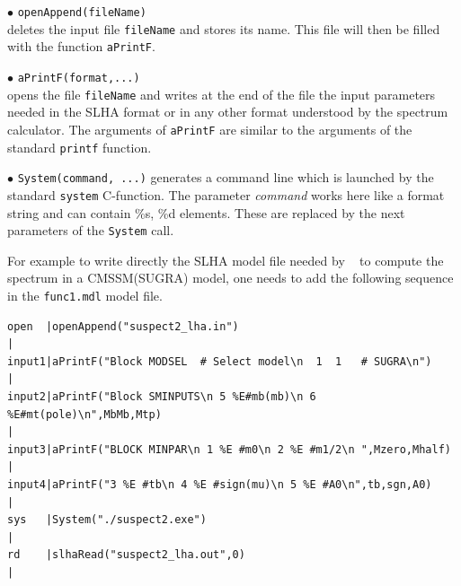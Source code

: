 \documentclass[12pt,a4paper]{article}
\begin{document}
\noindent
$\bullet$ \verb|openAppend(fileName)|\\
deletes the input file \verb|fileName| and stores its name. This file will then be filled with
the function \verb|aPrintF|.

\noindent
$\bullet$ \verb|aPrintF(format,...)|\\
opens the file \verb|fileName| and writes at the end of the file the input parameters needed in the SLHA format or in any other format
understood by the spectrum calculator.  The arguments of 
\verb|aPrintF| are similar to the arguments of the standard \verb|printf| function.

\noindent
$\bullet$ \verb|System(command, ...)|  
generates a command line which is launched by the standard \verb|system|
C-function. The parameter {\it command} works here like a format string and can contain \%s, \%d elements. 
These are replaced by the next parameters  of the \verb|System|  call.

For example to write directly the SLHA model file needed by \suspect~ to compute 
the spectrum in a CMSSM(SUGRA) model, one needs to add the following sequence in the \verb|func1.mdl| model file.

\begin{verbatim}
open  |openAppend("suspect2_lha.in")                                                                                                                                                                                                                             |
input1|aPrintF("Block MODSEL  # Select model\n  1  1   # SUGRA\n")                                                                                                                                                                              |
input2|aPrintF("Block SMINPUTS\n 5 %E#mb(mb)\n 6 %E#mt(pole)\n",MbMb,Mtp)                                                                                                                                                               |
input3|aPrintF("BLOCK MINPAR\n 1 %E #m0\n 2 %E #m1/2\n ",Mzero,Mhalf)                                                                                                                                          |
input4|aPrintF("3 %E #tb\n 4 %E #sign(mu)\n 5 %E #A0\n",tb,sgn,A0)                                                                                                                                          |
sys   |System("./suspect2.exe")                                                                                                                                                                                                                                 |
rd    |slhaRead("suspect2_lha.out",0)                                                                                                                                                                                                                           |
\end{verbatim}
\end{document}
